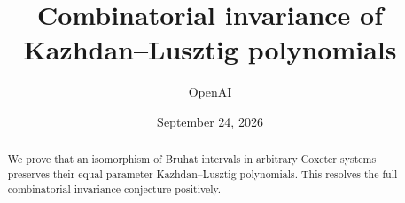 \documentclass[11pt]{article}
\title{Combinatorial invariance of\\Kazhdan--Lusztig polynomials}
\author{OpenAI}
\date{September 24, 2026}
\theoremstyle{definition}
\theoremstyle{remark}
\numberwithin{equation}{section}
\begin{document}
\maketitle
\begin{abstract}
We prove that an isomorphism of Bruhat intervals in arbitrary Coxeter
systems preserves their equal-parameter Kazhdan--Lusztig polynomials.
This resolves the full combinatorial invariance conjecture positively.
\end{abstract}
\tableofcontents






\end{document}
